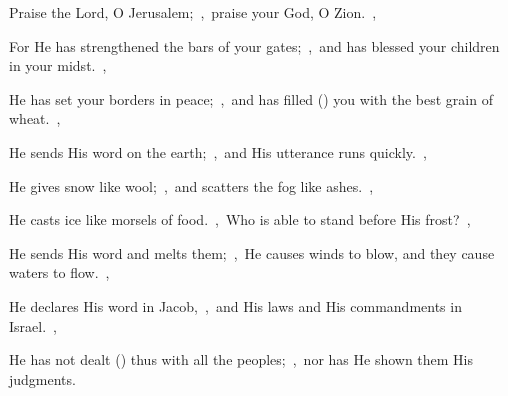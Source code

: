 \documentclass[12pt,twoside,a5paper]{article}
\begin{document}
\begin{normalparskip}
  Praise the Lord, O Jerusalem;~\sep\ praise your God, O Zion.~\sep


  For He has strengthened the bars of your gates;~\sep\ and has blessed your children in your midst.~\sep

  He has set your borders in peace;~\sep\ and has filled () you with the best grain of wheat.~\sep

  He sends His word on the earth;~\sep\ and His utterance runs quickly.~\sep

  He gives snow like wool;~\sep\ and scatters the fog like ashes.~\sep

  He casts ice like morsels of food.~\sep\ Who is able to stand before His frost?~\sep

  He sends His word and melts them;~\sep\ He causes winds to blow, and they cause waters to flow.~\sep

  He declares His word in Jacob,~\sep\ and His laws and His commandments in Israel.~\sep

  He has not dealt () thus with all the peoples;~\sep\ nor has He shown them His judgments.
\end{normalparskip}

\end{document}
